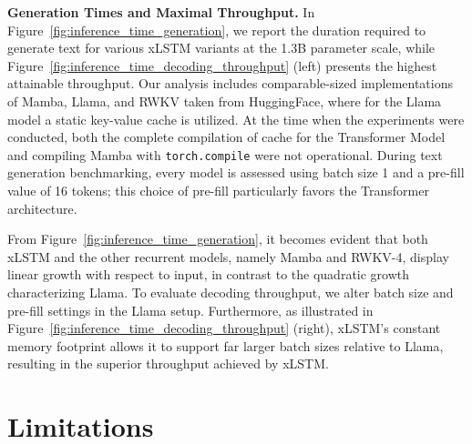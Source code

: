 \textbf{Generation Times and Maximal Throughput.} In Figure~\ref{fig:inference_time_generation}, we report the duration required to generate text for various xLSTM variants at the 1.3B parameter scale, while Figure~\ref{fig:inference_time_decoding_throughput} (left) presents the highest attainable throughput. Our analysis includes comparable-sized implementations of Mamba, Llama, and RWKV taken from HuggingFace, where for the Llama model a static key-value cache is utilized. At the time when the experiments were conducted, both the complete compilation of cache for the Transformer Model and compiling Mamba with \texttt{torch.compile} were not operational. During text generation benchmarking, every model is assessed using batch size 1 and a pre-fill value of 16 tokens; this choice of pre-fill particularly favors the Transformer architecture.

From Figure~\ref{fig:inference_time_generation}, it becomes evident that both xLSTM and the other recurrent models, namely Mamba and RWKV-4, display linear growth with respect to input, in contrast to the quadratic growth characterizing Llama. To evaluate decoding throughput, we alter batch size and pre-fill settings in the Llama setup. Furthermore, as illustrated in Figure~\ref{fig:inference_time_decoding_throughput} (right), xLSTM's constant memory footprint allows it to support far larger batch sizes relative to Llama, resulting in the superior throughput achieved by xLSTM.

\section{Limitations}

